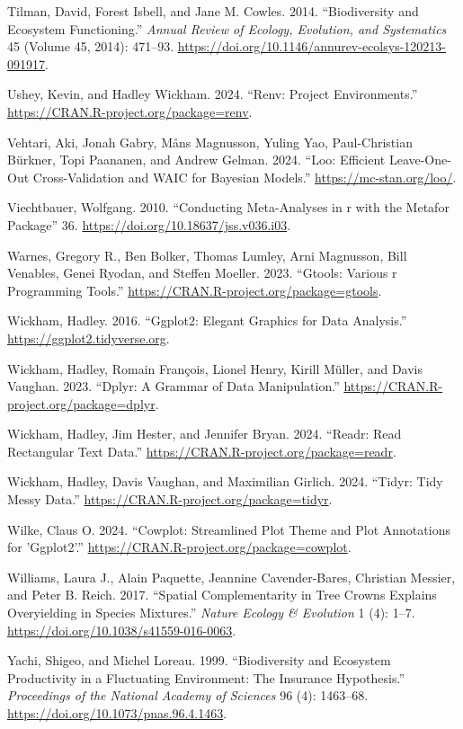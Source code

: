 \documentclass[
  letterpaper,
  DIV=11,
  numbers=noendperiod]{scrartcl}
\newlength{\cslhangindent}
\newenvironment{CSLReferences}[2] %
 {\begin{list}{}{%
  \setlength{\itemindent}{0pt}
  \setlength{\leftmargin}{0pt}
  \setlength{\parsep}{0pt}
  \ifodd #1
   \setlength{\leftmargin}{\cslhangindent}
   \setlength{\itemindent}{-1\cslhangindent}
  \fi
  \setlength{\itemsep}{#2\baselineskip}}}
 {\end{list}}
\begin{document}
\begin{CSLReferences}{1}{0}
Tilman, David, Forest Isbell, and Jane M. Cowles. 2014. {``Biodiversity
and Ecosystem Functioning.''} \emph{Annual Review of Ecology, Evolution,
and Systematics} 45 (Volume 45, 2014): 471--93.
\url{https://doi.org/10.1146/annurev-ecolsys-120213-091917}.

Ushey, Kevin, and Hadley Wickham. 2024. {``Renv: Project
Environments.''} \url{https://CRAN.R-project.org/package=renv}.

Vehtari, Aki, Jonah Gabry, Måns Magnusson, Yuling Yao, Paul-Christian
Bürkner, Topi Paananen, and Andrew Gelman. 2024. {``Loo: Efficient
Leave-One-Out Cross-Validation and WAIC for Bayesian Models.''}
\url{https://mc-stan.org/loo/}.

Viechtbauer, Wolfgang. 2010. {``Conducting Meta-Analyses in
{\textbraceleft}r{\textbraceright} with the
{\textbraceleft}Metafor{\textbraceright} Package''} 36.
\url{https://doi.org/10.18637/jss.v036.i03}.

Warnes, Gregory R., Ben Bolker, Thomas Lumley, Arni Magnusson, Bill
Venables, Genei Ryodan, and Steffen Moeller. 2023. {``Gtools: Various r
Programming Tools.''} \url{https://CRAN.R-project.org/package=gtools}.

Wickham, Hadley. 2016. {``Ggplot2: Elegant Graphics for Data
Analysis.''} \url{https://ggplot2.tidyverse.org}.

Wickham, Hadley, Romain François, Lionel Henry, Kirill Müller, and Davis
Vaughan. 2023. {``Dplyr: A Grammar of Data Manipulation.''}
\url{https://CRAN.R-project.org/package=dplyr}.

Wickham, Hadley, Jim Hester, and Jennifer Bryan. 2024. {``Readr: Read
Rectangular Text Data.''}
\url{https://CRAN.R-project.org/package=readr}.

Wickham, Hadley, Davis Vaughan, and Maximilian Girlich. 2024. {``Tidyr:
Tidy Messy Data.''} \url{https://CRAN.R-project.org/package=tidyr}.

Wilke, Claus O. 2024. {``Cowplot: Streamlined Plot Theme and Plot
Annotations for 'Ggplot2'.''}
\url{https://CRAN.R-project.org/package=cowplot}.

Williams, Laura J., Alain Paquette, Jeannine Cavender-Bares, Christian
Messier, and Peter B. Reich. 2017. {``Spatial Complementarity in Tree
Crowns Explains Overyielding in Species Mixtures.''} \emph{Nature
Ecology \& Evolution} 1 (4): 1--7.
\url{https://doi.org/10.1038/s41559-016-0063}.

Yachi, Shigeo, and Michel Loreau. 1999. {``Biodiversity and Ecosystem
Productivity in a Fluctuating Environment: The Insurance Hypothesis.''}
\emph{Proceedings of the National Academy of Sciences} 96 (4): 1463--68.
\url{https://doi.org/10.1073/pnas.96.4.1463}.

\end{CSLReferences}
\end{document}
